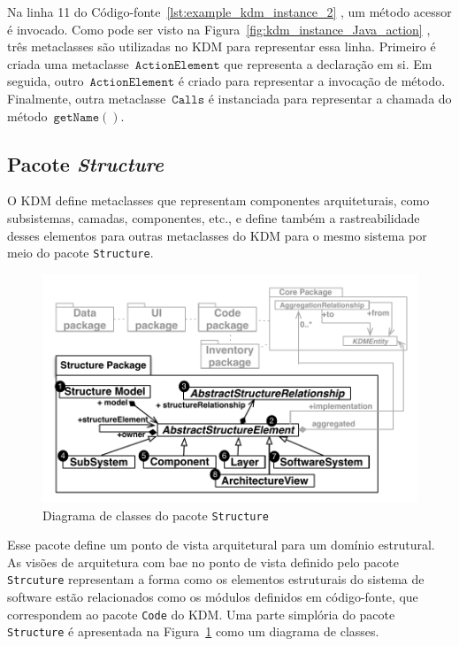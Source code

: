 Na linha 11 do Código-fonte~\ref{lst:example_kdm_instance_2} , um método acessor é invocado. Como pode ser visto na Figura~\ref{fig:kdm_instance_Java_action} , três metaclasses são utilizadas no KDM para representar essa linha. Primeiro é criada uma metaclasse~$\mathtt{ActionElement}$ que representa a declaração em si. Em seguida, outro~$\mathtt{ActionElement}$ é criado para representar a invocação de método. Finalmente, outra metaclasse~$\mathtt{Calls}$ é instanciada para representar a chamada do método~$\mathtt{getName()}$.

\subsection{Pacote \textit{Structure}}\label{sec:structurePackage}

O KDM define metaclasses que representam componentes arquiteturais, como subsistemas, camadas, componentes, etc., e define também a rastreabilidade desses elementos para outras metaclasses do KDM para o mesmo sistema por meio do pacote \texttt{Structure}.

\begin{figure}[h]
	\centering
	\caption{Diagrama de classes do pacote \texttt{Structure}\label{fig:structureModel}}
	\includegraphics[scale=0.67]{images/StructurePackageFigure}
\end{figure}

Esse pacote define um ponto de vista arquitetural para um domínio estrutural. As visões de arquitetura com bae no ponto de vista definido pelo pacote \texttt{Strcuture} representam a forma como os elementos estruturais do sistema de software estão relacionados como os módulos definidos em código-fonte, que correspondem ao pacote \texttt{Code} do KDM. Uma parte simplória do pacote \texttt{Structure} é apresentada na Figura~\ref{fig:structureModel} como um diagrama de classes.

